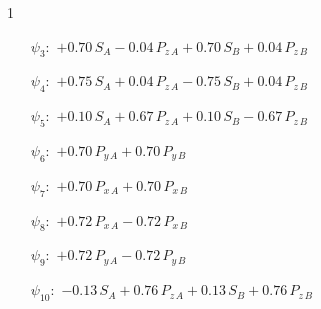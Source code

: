 

\setcounter{question}{1}
\begin{questionBox}1{}
    \begin{itemize}
        \item[\(\psi_3:\)]
            \(
            +   0.70\,S_A
            -   0.04\,P_{z\,A}
            +   0.70\,S_B
            +   0.04\,P_{z\,B}
            \)
        \item[\(\psi_4:\)]
            \(
            +   0.75\,S_A
            +   0.04\,P_{z\,A}
            -   0.75\,S_B
            +   0.04\,P_{z\,B}
            \)
        \item[\(\psi_5:\)]
            \(
            +   0.10\,S_A
            +   0.67\,P_{z\,A}
            +   0.10\,S_B
            -   0.67\,P_{z\,B}
            \)
        \item[\(\psi_6:\)]
            \(
            +   0.70\,P_{y\,A}
            +   0.70\,P_{y\,B}
            \)
        \item[\(\psi_7:\)]
            \(
            +   0.70\,P_{x\,A}
            +   0.70\,P_{x\,B}
            \)
        \item[\(\psi_8:\)]
            \(
            +   0.72\,P_{x\,A}
            -   0.72\,P_{x\,B}
            \)
        \item[\(\psi_9:\)]
            \(
            +   0.72\,P_{y\,A}
            -   0.72\,P_{y\,B}
            \)
        \item[\(\psi_{10}:\)]
            \(
            -   0.13\,S_A
            +   0.76\,P_{z\,A}
            +   0.13\,S_B
            +   0.76\,P_{z\,B}
            \)
    \end{itemize}
\end{questionBox}


